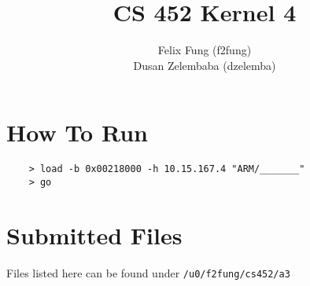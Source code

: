 \documentclass[letterpaper]{article}
\begin{document}
\title{CS 452 Kernel 4}
\author{Felix Fung (f2fung) \\ Dusan Zelembaba (dzelemba)}
\maketitle

\section{How To Run}
\begin{verbatim}
	> load -b 0x00218000 -h 10.15.167.4 "ARM/_______"
	> go
\end{verbatim}

\section{Submitted Files}

Files listed here can be found under \verb!/u0/f2fung/cs452/a3!
\end{document}
